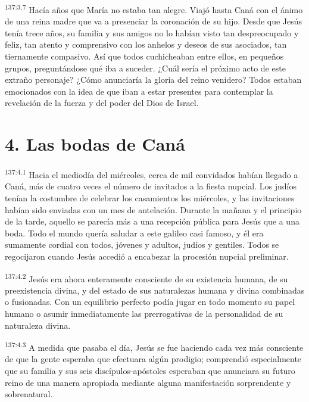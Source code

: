 \par
\textsuperscript{137:3.7} Hacía años que María no estaba tan alegre. Viajó hasta Caná con el ánimo de una reina madre que va a presenciar la coronación de su hijo. Desde que Jesús tenía trece años, su familia y sus amigos no lo habían visto tan despreocupado y feliz, tan atento y comprensivo con los anhelos y deseos de sus asociados, tan tiernamente compasivo. Así que todos cuchicheaban entre ellos, en pequeños grupos, preguntándose qué iba a suceder. ¿Cuál sería el próximo acto de este extraño personaje? ¿Cómo anunciaría la gloria del reino venidero? Todos estaban emocionados con la idea de que iban a estar presentes para contemplar la revelación de la fuerza y del poder del Dios de Israel.

\section*{4. Las bodas de Caná}
\par
\textsuperscript{137:4.1} Hacia el mediodía del miércoles, cerca de mil convidados habían llegado a Caná, más de cuatro veces el número de invitados a la fiesta nupcial. Los judíos tenían la costumbre de celebrar los casamientos los miércoles, y las invitaciones habían sido enviadas con un mes de antelación. Durante la mañana y el principio de la tarde, aquello se parecía más a una recepción pública para Jesús que a una boda. Todo el mundo quería saludar a este galileo casi famoso, y él era sumamente cordial con todos, jóvenes y adultos, judíos y gentiles. Todos se regocijaron cuando Jesús accedió a encabezar la procesión nupcial preliminar.

\par
\textsuperscript{137:4.2} Jesús era ahora enteramente consciente de su existencia humana, de su preexistencia divina, y del estado de sus naturalezas humana y divina combinadas o fusionadas. Con un equilibrio perfecto podía jugar en todo momento su papel humano o asumir inmediatamente las prerrogativas de la personalidad de su naturaleza divina.

\par
\textsuperscript{137:4.3} A medida que pasaba el día, Jesús se fue haciendo cada vez más consciente de que la gente esperaba que efectuara algún prodigio; comprendió especialmente que su familia y sus seis discípulos-apóstoles esperaban que anunciara su futuro reino de una manera apropiada mediante alguna manifestación sorprendente y sobrenatural.

